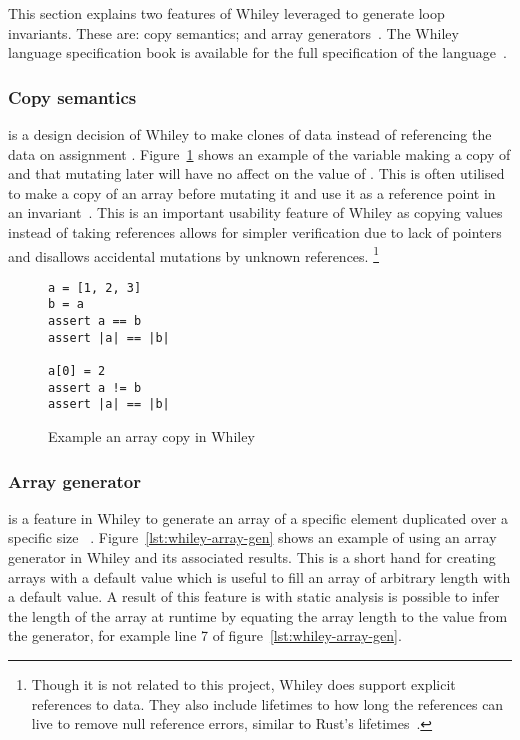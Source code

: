 This section explains two features of Whiley leveraged to generate loop invariants.
These are: copy semantics; and array generators~\cite{whiley-design}.
The Whiley language specification book is available for the full
specification of the language~\cite{whiley-spec}.

\subsubsection{Copy semantics} is a design decision of Whiley to
make clones of data instead of referencing the data on assignment \cite{whiley-arrays}.
Figure~\ref{lst:whiley-array-copy} shows an example of the variable
 making a copy of  and that mutating  later
will have no affect on the value of .
This is often utilised to make a copy of an array before mutating it
and use it as a reference point in an invariant~\cite{whiley-arrays}.
This is an important usability feature of Whiley as copying values
instead of taking references allows for simpler verification due to lack
of pointers and disallows accidental mutations by unknown references.
\footnote{
Though it is not related to this project,
Whiley does support explicit references to data.
They also include lifetimes to how long the references can live
to remove null reference errors, similar to Rust's lifetimes~\cite{rust-lang}.
}

\begin{figure}[ht]
\begin{lstlisting}
a = [1, 2, 3]
b = a
assert a == b
assert |a| == |b|

a[0] = 2
assert a != b
assert |a| == |b|
\end{lstlisting}
\caption{Example an array copy in Whiley}
\label{lst:whiley-array-copy}
\end{figure}

\subsubsection{Array generator} is a feature in Whiley to generate an array
of a specific element duplicated over a specific size~\cite{whiley-spec}
\cite{whiley-arrays}.
Figure~\ref{lst:whiley-array-gen} shows an example of using an array generator
in Whiley and its associated results.
This is a short hand for creating arrays with a default value which is useful
to fill an array of arbitrary length with a default value.
A result of this feature is with static analysis is possible to infer the
length of the array at runtime by equating the array length to the value
from the generator, for example line 7 of figure~\ref{lst:whiley-array-gen}.

